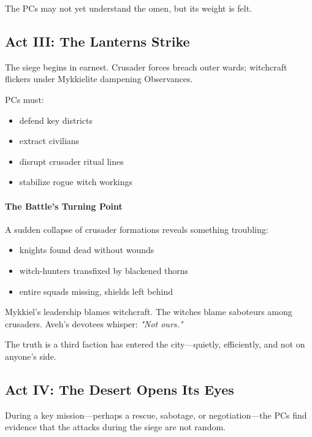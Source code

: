 \documentclass[11pt]{book}
\begin{document}
The PCs may not yet understand the omen, but its weight is felt.

\subsection{Act III: The Lanterns Strike}

The siege begins in earnest.  
Crusader forces breach outer wards; witchcraft flickers under Mykkielite dampening Observances.

PCs must:
\begin{itemize}[leftmargin=*]
    \item defend key districts  
    \item extract civilians  
    \item disrupt crusader ritual lines  
    \item stabilize rogue witch workings  
\end{itemize}

\paragraph{The Battle's Turning Point}  
A sudden collapse of crusader formations reveals something troubling:
\begin{itemize}
    \item knights found dead without wounds  
    \item witch-hunters transfixed by blackened thorns  
    \item entire squads missing, shields left behind  
\end{itemize}

Mykkiel's leadership blames witchcraft.  
The witches blame saboteurs among crusaders.  
Aveh's devotees whisper: \emph{"Not ours."}

The truth is a third faction has entered the city---quietly, efficiently, and not on anyone's side.

\subsection{Act IV: The Desert Opens Its Eyes}

During a key mission---perhaps a rescue, sabotage, or negotiation---the PCs find evidence that
the attacks during the siege are not random.
\end{document}
